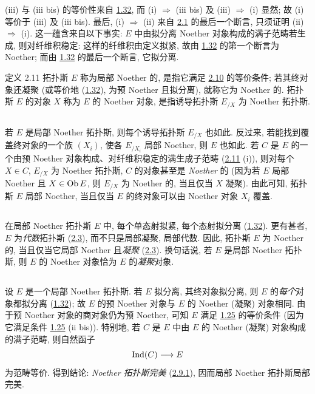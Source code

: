 (iii) 与 (iii bis) 的等价性来自 \hyperref[VI.subsec1.32]{1.32},
而 (i) $\Rightarrow$ (iii bis) 及 (iii) $\Rightarrow$ (i) 显然;
故 (i) 等价于 (iii) 及 (iii bis).
最后, (i) $\Rightarrow$ (ii)
来自 \hyperref[VI.prop2.1]{2.1} 的最后一个断言,\pageoriginale{}
只须证明 (ii) $\Rightarrow$ (i).
这一蕴含来自以下事实:
$E$ 中由拟分离 Noether 对象构成的满子范畴若生成, 则对纤维积稳定:
这样的纤维积由定义拟紧,
故由 \hyperref[VI.subsec1.32]{1.32} 的第一个断言为 Noether;
而由 \hyperref[VI.subsec1.32]{1.32} 的最后一个断言, 它拟分离.

\begin{enonce*}{定义 2.11}
拓扑斯 $E$ 称为局部 Noether 的,
是指它满足 \hyperref[VI.prop2.10]{2.10} 的等价条件;
若其终对象还凝聚
(或等价地 (\hyperref[VI.subsec1.32]{1.32}), 为预 Noether 且拟分离),
就称它为 Noether 的.
拓扑斯 $E$ 的对象 $X$ 称为 $E$ 的 Noether 对象,
是指诱导拓扑斯 $E_{/X}$ 为 Noether 拓扑斯.
\end{enonce*}

\setcounter{subsection}{11}
\subsection{}
若 $E$ 是局部 Noether 拓扑斯,
则每个诱导拓扑斯 $E_{/X}$ 也如此.
反过来, 若能找到覆盖终对象的一个族 $(X_i)$,
使各 $E_{/X_i}$ 局部 Noether, 则 $E$ 也如此.
若 $C$ 是 $E$ 的一个由预 Noether 对象构成、对纤维积稳定的满生成子范畴
(\hyperref[VI.def2.11]{2.11} (i)),
则对每个 $X \in C$, $E_{/X}$ 为 Noether 拓扑斯,
\ie $C$ 的对象甚至是 \emph{Noether} 的
(因为若 $E$ 局部 Noether 且 $X \in \operatorname{Ob} E$,
则 $E_{/X}$ 为 Noether 的, 当且仅当 $X$ 凝聚).
由此可知, 拓扑斯 $E$ 局部 Noether,
当且仅当 $E$ 的终对象可以由 Noether 对象 $X_i$ 覆盖.

\subsection{}
在局部 Noether 拓扑斯 $E$ 中,\pageoriginale{}
每个单态射拟紧, 每个态射拟分离
(\hyperref[VI.subsec1.32]{1.32}).
更有甚者, $E$ 为\emph{代数}拓扑斯
(\hyperref[VI.def2.3]{2.3}),
而不只是局部凝聚, \ie 局部代数.
因此, 拓扑斯 $E$ 为 Noether 的,
当且仅当它局部 Noether 且\emph{凝聚}
(\hyperref[VI.def2.3]{2.3}).
换句话说, 若 $E$ 是局部 Noether 拓扑斯,
则 $E$ 的 Noether 对象恰为 $E$ 的\emph{凝聚}对象.

\subsection{}
设 $E$ 是一个局部 Noether 拓扑斯.
若 $E$ 拟分离, \ie 其终对象拟分离,
则 $E$ 的\emph{每个}对象都拟分离
(\hyperref[VI.subsec1.32]{1.32});
故 $E$ 的预 Noether 对象与 $E$ 的 Noether
(\ie 凝聚) 对象相同.
由于预 Noether 对象的商对象仍为预 Noether,
可知 $E$ 满足 \hyperref[VI.cor1.25]{1.25} 的等价条件
(因为它满足条件 \hyperref[VI.cor1.25]{1.25} (ii bis)).
特别地, 若 $C$ 是 $E$ 中由 $E$ 的 Noether (凝聚) 对象构成的满子范畴,
则自然函子
$$
\Ind(C) \to E
$$
为范畴等价.
得到结论: \emph{Noether 拓扑斯完美}
(\hyperref[VI.def2.9.1]{2.9.1}),
因而局部 Noether 拓扑斯局部完美.

